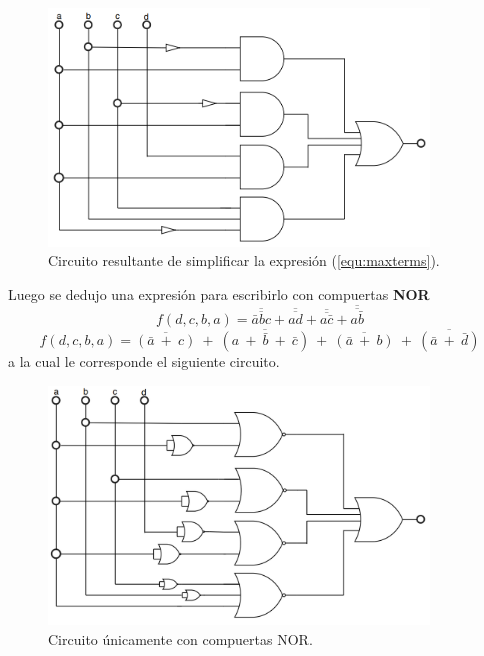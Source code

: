 \documentclass[a4paper]{article}
\begin{document}
\begin{figure}[H]
	\centering
	\includegraphics[width=0.9\textwidth]{Circuito2.PNG}
\caption{Circuito resultante de simplificar la expresión (\ref{equ:maxterms}).}
	\label{fig:circ2}
\end{figure}
Luego se dedujo una expresión para escribirlo con compuertas \textbf{NOR}
\[
	f \left( d,c,b,a \right) = \overline{\overline{\bar{a} b c}} + \overline{\overline{a d}} + \overline{\overline{a \bar{c}}} + \overline{\overline{a \bar{b}}}
\]
\[
	f \left( d,c,b,a \right) = \overline{ \left( \bar{a} \ + \ c \right) } \ + \ \overline{ \left( a \ + \ \bar{b} \ + \ \bar{c} \right) } \ + \ \overline{ \left( \bar{a} \ + \ b \right) } \ + \ \overline{ \left( \bar{a} \ + \ \bar{d}\right) }
\]
a la cual le corresponde el siguiente circuito.

\begin{figure}[H]
	\centering
	\includegraphics[width=0.9\textwidth]{Circuito5.PNG}
\caption{Circuito únicamente con compuertas NOR.}
	\label{fig:circ5}
\end{figure}
\end{document}
